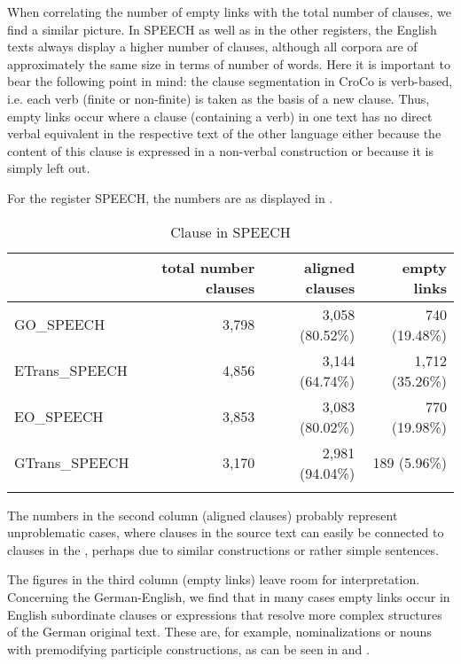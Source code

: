 \documentclass[output=paper]{LSP/langsci}
\begin{document}
When correlating the number of empty links with the total number of clauses, we find a similar picture. In SPEECH as well as in the other registers, the English texts always display a higher number of clauses, although all corpora are of approximately the same size in terms of number of words. Here it is important to bear the following point in mind: the clause segmentation in CroCo is verb-based, i.e. each verb (finite or non-finite) is taken as the basis of a new clause. Thus, empty links occur where a clause (containing a verb) in one text has no direct verbal equivalent in the respective text of the other language either because the content of this clause is expressed in a non-verbal construction or because it is simply left out.

\newpage
For the register SPEECH, the numbers are as displayed in .






\begin{table}[b]
\begin{tabular}{lrrr} 
\lsptoprule
{} & total number clauses & aligned clauses & empty links\\
\midrule
GO\_SPEECH & 3,798 & 3,058 (80.52\%) & 740 (19.48\%)\\
ETrans\_SPEECH & 4,856 & 3,144 (64.74\%) & 1,712 (35.26\%)\\
EO\_SPEECH & 3,853 & 3,083 (80.02\%) & 770 (19.98\%)\\
GTrans\_SPEECH & 3,170 & 2,981 (94.04\%) & 189 (5.96\%)\\
\lspbottomrule
\end{tabular}
\caption{Clause  in SPEECH}
\label{tab:culo:2}
\end{table}



The numbers in the second column (aligned clauses) probably represent unproblematic cases, where clauses in the source text can easily be connected to clauses in the , perhaps due to similar constructions or rather simple sentences. 

The figures in the third column (empty links) leave room for interpretation. Concerning the  German-English, we find that in many cases empty links occur in English subordinate clauses or expressions that resolve more complex structures of the German original text. These are, for example, nominalizations or nouns with premodifying participle constructions, as can be seen in  and .
\end{document}

